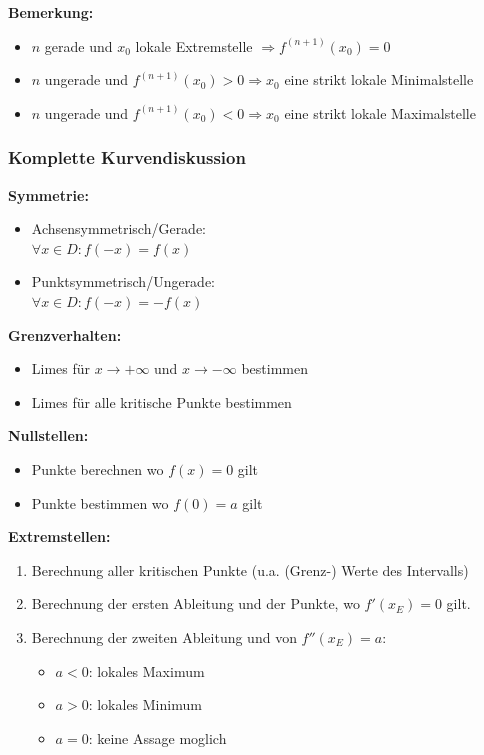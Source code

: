 \documentclass[a4paper,8pt]{extarticle}
\newenvironment{bemerkung}{
   \noindent \textbf{Bemerkung:  }}{}
\begin{document}
\begin{bemerkung}
  \begin{itemize}
    \item $n$ gerade und $x_0$ lokale Extremstelle $\Rightarrow f^{(n+1)}(x_0) = 0$
    \item $n$ ungerade und $ f^{(n+1)}(x_0) > 0 \Rightarrow x_0$ eine strikt lokale Minimalstelle
    \item $n$ ungerade und $ f^{(n+1)}(x_0) < 0 \Rightarrow x_0$ eine strikt lokale Maximalstelle
  \end{itemize}
\end{bemerkung}

\subsubsection{Komplette Kurvendiskussion}
\textbf{Symmetrie:}
\begin{itemize}
  \item Achsensymmetrisch/Gerade: \\ $\forall x \in D: f(-x) = f(x)$
  \item Punktsymmetrisch/Ungerade: \\ $\forall x \in D: f(-x) = -f(x)$
\end{itemize}

\textbf{Grenzverhalten:}
\begin{itemize}
  \item Limes für $x \to +\infty$ und $x \to -\infty$ bestimmen
  \item Limes für alle kritische Punkte bestimmen
\end{itemize}

\textbf{Nullstellen:}
\begin{itemize}
  \item Punkte berechnen wo $f(x) = 0$ gilt
  \item Punkte bestimmen wo $f(0) = a$ gilt
\end{itemize}

\textbf{Extremstellen:}
\begin{enumerate}
  \item Berechnung aller kritischen Punkte (u.a.
  (Grenz-) Werte des Intervalls)
  \item Berechnung der ersten Ableitung und der
  Punkte, wo $f'(x_E) = 0$ gilt.
  \item  Berechnung der zweiten Ableitung und von $f''(x_E) = a$:
        \begin{itemize}
          \item $a < 0$: lokales Maximum
          \item $a > 0$: lokales Minimum
          \item $a = 0$: keine Assage moglich
        \end{itemize}
\end{enumerate}
\end{document}
